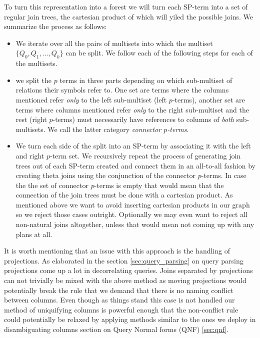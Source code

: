 To turn this representation into a forest we will turn each SP-term
into a set of regular join trees, the cartesian product of which will
yiled the possible joins. We summarize the process as follows:

\begin{itemize}
\item We iterate over all the pairs of multisets into which the multiset
  \(\{Q_0,Q_1,...,Q_k\}\) can be split. We follow each of the
  following steps for each of the multisets.
\item we split the \(p\) terms in three parts depending on which
  sub-multiset of relations their symbols refer to. One set are terms
  where the columns mentioned refer \emph{only} to the left sub-multiset
  (left \(p\)-terms), another set are terms where columns mentioned
  refer \emph{only} to the right sub-multiset and the rest (right
  \(p\)-terms) must necessarily have references to columns of \emph{both}
  sub-multisets. We call the latter category \emph{connector \(p\)-terms}.
\item We turn each side of the split into an SP-term by associating it
  with the left and right \(p\)-term set. We recursively repeat the
  process of generating join trees out of each SP-term created and
  connect them in an all-to-all fashion by creating theta joins using
  the conjunction of the connector \(p\)-terms. In case the the set of
  connector \(p\)-terms is empty that would mean that the connection
  of the join trees must be done with a cartesian product. As
  mentioned above we want to avoid inserting cartesian products in our
  graph so we reject those cases outright. Optionally we may even want
  to reject all non-natural joins altogether, unless that would mean
  not coming up with any plans at all.
\end{itemize}


It is worth mentioning that an issue with this approach is the
handling of projections. As elaborated in the section
\ref{sec:query_parsing} on query parsing projections come up a lot in
decorrelating queries. Joins separated by projections can not
trivially be mixed with the above method as moving projections would
potentially break the rule that we demand that there is no naming
conflict between columns. Even though as things stand this case is not
handled our method of uniquifying columns is powerful enough that the
non-conflict rule could potentially be relaxed by applying methods
similar to the ones we deploy in disambiguating columns section on
Query Normal forms (QNF) \ref{sec:qnf}.

